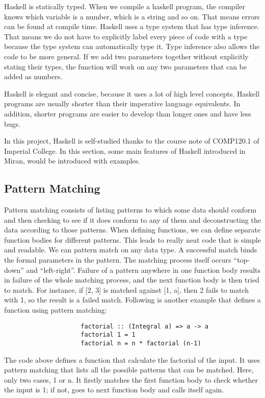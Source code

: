 Haskell is statically typed. When we compile a haskell program, the compiler knows which variable is a number, which is a string and so on. That means errors can be found at compile time. Haskell uses a type system that has type inference. That means we do not have to explicitly label every piece of code with a type because the type system can automatically type it. Type inference also allows the code to be more general. If we add two parameters together without explicitly stating their types, the function will work on any two parameters that can be added as numbers. 

Haskell is elegant and concise, because it uses a lot of high level concepts. Haskell programs are usually shorter than their imperative language equivalents. In addition, shorter programs are easier to develop than longer ones and have less bugs. 

In this project, Haskell is self-studied thanks to the course note of COMP120.1 of Imperial College. In this section, some main features of Haskell introduced in Miran\cite{miran2011}, would be introduced with examples.

\subsection{Pattern Matching}
Pattern matching consists of listing patterns to which some data should conform and then checking to see if it does conform to any of them and deconstructing the data according to those patterns. When defining functions, we can define separate function bodies for different patterns. This leads to really neat code that is simple and readable. We can pattern match on any data type. A successful match binds the formal parameters in the pattern. The matching process itself occurs ``top-down'' and ``left-right''. Failure of a pattern anywhere in one function body results in failure of the whole matching process, and the next function body is then tried to match. For instance, if [2, 3] is matched against [1, a], then 2 fails to match with 1, so the result is a failed match. Following is another example that defines a function using pattern matching:

\begin{verbatim}
                     factorial :: (Integral a) => a -> a  
                     factorial 1 = 1
                     factorial n = n * factorial (n-1)
\end{verbatim}

The code above defines a function that calculate the factorial of the input. It uses pattern matching that lists all the possible patterns that can be matched. Here, only two cases, 1 or n. It firstly matches the first function body to check whether the input is 1; if not, goes to next function body and calls itself again.   

